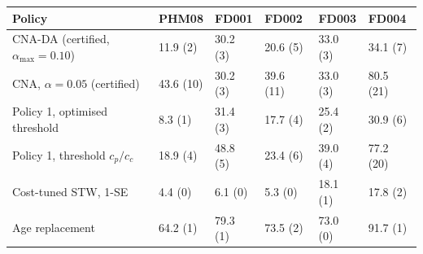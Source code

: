 \begin{tabular}{@{}llllll@{}}
\toprule
Policy & PHM08 & FD001 & FD002 & FD003 & FD004 \\
\midrule
CNA-DA (certified, $\alpha_{\max}=0.10$) & 11.9 (2) & 30.2 (3) & 20.6 (5) & 33.0 (3) & 34.1 (7) \\
CNA, $\alpha=0.05$ (certified) & 43.6 (10) & 30.2 (3) & 39.6 (11) & 33.0 (3) & 80.5 (21) \\
Policy 1, optimised threshold & 8.3 (1) & 31.4 (3) & 17.7 (4) & 25.4 (2) & 30.9 (6) \\
Policy 1, threshold $c_p/c_c$ & 18.9 (4) & 48.8 (5) & 23.4 (6) & 39.0 (4) & 77.2 (20) \\
Cost-tuned STW, 1-SE & 4.4 (0) & 6.1 (0) & 5.3 (0) & 18.1 (1) & 17.8 (2) \\
Age replacement & 64.2 (1) & 79.3 (1) & 73.5 (2) & 73.0 (0) & 91.7 (1) \\
\bottomrule
\end{tabular}
